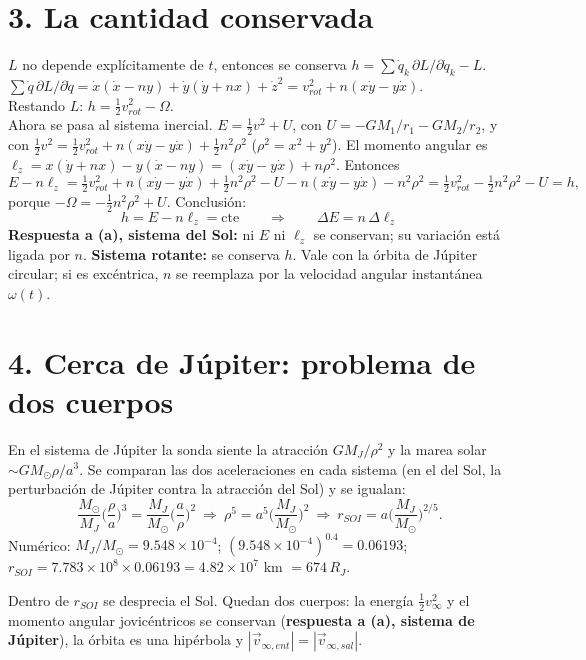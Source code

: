 \documentclass[11pt,letterpaper]{article}
\newcommand{\vinf}{v_\infty}\newcommand{\RJ}{R_J}
\begin{document}
\section*{3. La cantidad conservada}
$L$ no depende explícitamente de $t$, entonces se conserva $h=\sum\dot q_k\,\partial L/\partial\dot q_k-L$.\\
$\sum\dot q\,\partial L/\partial\dot q=\dot x(\dot x-ny)+\dot y(\dot y+nx)+\dot z^2=v_{rot}^2+n(x\dot y-y\dot x)$.\\
Restando $L$: $h=\tfrac12v_{rot}^2-\Omega$.\\
Ahora se pasa al sistema inercial. $E=\tfrac12v^2+U$, con $U=-GM_1/r_1-GM_2/r_2$, y con $\tfrac12v^2=\tfrac12v_{rot}^2+n(x\dot y-y\dot x)+\tfrac12n^2\rho^2$ ($\rho^2=x^2+y^2$). El momento angular es $\ell_z=x(\dot y+nx)-y(\dot x-ny)=(x\dot y-y\dot x)+n\rho^2$. Entonces
\[E-n\ell_z=\tfrac12v_{rot}^2+n(x\dot y-y\dot x)+\tfrac12n^2\rho^2-U-n(x\dot y-y\dot x)-n^2\rho^2=\tfrac12v_{rot}^2-\tfrac12n^2\rho^2-U=h,\]
porque $-\Omega=-\tfrac12n^2\rho^2+U$. Conclusión:
\[\boxed{h=E-n\ell_z=\text{cte}\qquad\Rightarrow\qquad\Delta E=n\,\Delta\ell_z}\]
\textbf{Respuesta a (a), sistema del Sol:} ni $E$ ni $\ell_z$ se conservan; su variación está ligada por $n$. \textbf{Sistema rotante:} se conserva $h$. Vale con la órbita de Júpiter circular; si es excéntrica, $n$ se reemplaza por la velocidad angular instantánea $\omega(t)$.

\section*{4. Cerca de Júpiter: problema de dos cuerpos}
En el sistema de Júpiter la sonda siente la atracción $GM_J/\rho^2$ y la marea solar $\sim GM_\odot\rho/a^3$. Se comparan las dos aceleraciones en cada sistema (en el del Sol, la perturbación de Júpiter contra la atracción del Sol) y se igualan:
\[\frac{M_\odot}{M_J}\Big(\frac\rho a\Big)^3=\frac{M_J}{M_\odot}\Big(\frac a\rho\Big)^2\ \Rightarrow\ \rho^5=a^5\Big(\frac{M_J}{M_\odot}\Big)^2\ \Rightarrow\ r_{SOI}=a\Big(\frac{M_J}{M_\odot}\Big)^{2/5}.\]
Numérico: $M_J/M_\odot=9.548\times10^{-4}$; $(9.548\times10^{-4})^{0.4}=0.06193$; $r_{SOI}=7.783\times10^8\times0.06193=4.82\times10^7$ km $=674\,\RJ$.

Dentro de $r_{SOI}$ se desprecia el Sol. Quedan dos cuerpos: la energía $\tfrac12\vinf^2$ y el momento angular jovicéntricos se conservan (\textbf{respuesta a (a), sistema de Júpiter}), la órbita es una hipérbola y $|\vec v_{\infty,ent}|=|\vec v_{\infty,sal}|$.
\end{document}
